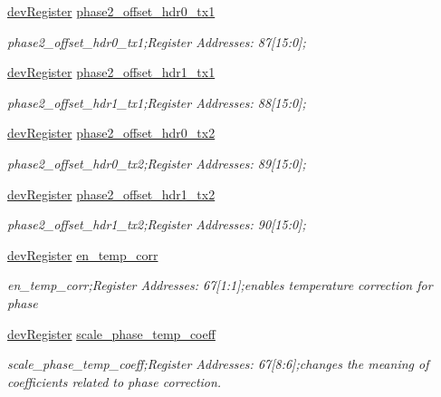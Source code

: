 \begin{DoxyCompactItemize}
\mbox{\hyperlink{classdev_register}{dev\+Register}} \mbox{\hyperlink{class_o_p_t3101_registers_ab1935ee4370a6f750250df8037bfedde}{phase2\+\_\+offset\+\_\+hdr0\+\_\+tx1}}
\begin{DoxyCompactList}\small\item\em phase2\+\_\+offset\+\_\+hdr0\+\_\+tx1;Register Addresses\+: 87\mbox{[}15\+:0\mbox{]}; \end{DoxyCompactList}\item 
\mbox{\hyperlink{classdev_register}{dev\+Register}} \mbox{\hyperlink{class_o_p_t3101_registers_a2d3f696ee5591f062782628adef648bc}{phase2\+\_\+offset\+\_\+hdr1\+\_\+tx1}}
\begin{DoxyCompactList}\small\item\em phase2\+\_\+offset\+\_\+hdr1\+\_\+tx1;Register Addresses\+: 88\mbox{[}15\+:0\mbox{]}; \end{DoxyCompactList}\item 
\mbox{\hyperlink{classdev_register}{dev\+Register}} \mbox{\hyperlink{class_o_p_t3101_registers_af3c53f1235e77bb975d6804ce5bb0aea}{phase2\+\_\+offset\+\_\+hdr0\+\_\+tx2}}
\begin{DoxyCompactList}\small\item\em phase2\+\_\+offset\+\_\+hdr0\+\_\+tx2;Register Addresses\+: 89\mbox{[}15\+:0\mbox{]}; \end{DoxyCompactList}\item 
\mbox{\hyperlink{classdev_register}{dev\+Register}} \mbox{\hyperlink{class_o_p_t3101_registers_aa35e683286a08ad2d2a80446c6a3578e}{phase2\+\_\+offset\+\_\+hdr1\+\_\+tx2}}
\begin{DoxyCompactList}\small\item\em phase2\+\_\+offset\+\_\+hdr1\+\_\+tx2;Register Addresses\+: 90\mbox{[}15\+:0\mbox{]}; \end{DoxyCompactList}\item 
\mbox{\hyperlink{classdev_register}{dev\+Register}} \mbox{\hyperlink{class_o_p_t3101_registers_ac4a7ed325293f445401f57b70b398d9a}{en\+\_\+temp\+\_\+corr}}
\begin{DoxyCompactList}\small\item\em en\+\_\+temp\+\_\+corr;Register Addresses\+: 67\mbox{[}1\+:1\mbox{]};enables temperature correction for phase \end{DoxyCompactList}\item 
\mbox{\hyperlink{classdev_register}{dev\+Register}} \mbox{\hyperlink{class_o_p_t3101_registers_a074f8c31300a5e95dbe613e29fae691a}{scale\+\_\+phase\+\_\+temp\+\_\+coeff}}
\begin{DoxyCompactList}\small\item\em scale\+\_\+phase\+\_\+temp\+\_\+coeff;Register Addresses\+: 67\mbox{[}8\+:6\mbox{]};changes the meaning of coefficients related to phase correction. \end{DoxyCompactList}\item 

\end{DoxyCompactItemize}
